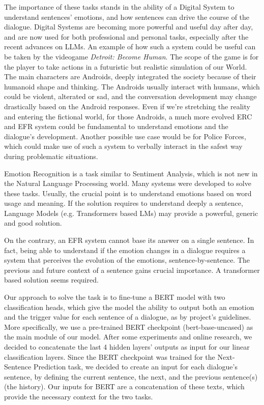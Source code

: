 \documentclass[11pt,table,xcdraw]{article}
\begin{document}
The importance of these tasks stands in the ability of a Digital System to understand sentences' emotions, and how sentences can drive the course of the dialogue. Digital Systems are becoming more powerful and useful day after day, and are now used for both professional and personal tasks, especially after the recent advances on LLMs. An example of how such a system could be useful can be taken by the videogame \textit{Detroit: Become Human}. The scope of the game is for the player to take actions in a futuristic but realistic simulation of our World. The main characters are Androids, deeply integrated the society because of their humanoid shape and thinking. The Androids usually interact with humans, which could be violent, alterated or sad, and the conversation development may change drastically based on the Android responses. Even if we're stretching the reality and entering the fictional world, for those Androids, a much more evolved ERC and EFR system could be fundamental to understand emotions and the dialogue's development. Another possible use case would be for Police Forces, which could make use of such a system to verbally interact in the safest way during problematic situations. 

Emotion Recognition is a task similar to Sentiment Analysis, which is not new in the Natural Language Processing world. Many systems were developed to solve these tasks. Usually, the crucial point is to understand emotions based on word usage and meaning. If the solution requires to understand deeply a sentence, Language Models (e.g. Transformers based LMs) may provide a powerful, generic and good solution.

On the contrary, an EFR system cannot base its answer on a single sentence. In fact, being able to understand if the emotion changes in a dialogue requires a system that perceives the evolution of the emotions, sentence-by-sentence. The previous and future context of a sentence gains crucial importance. A transformer based solution seems required.

Our approach to solve the task is to fine-tune a BERT model \cite{devlin2019bert} with two classification heads, which give the model the ability to output both an emotion and the trigger value for each sentence of a dialogue, as by project's guidelines. More specifically, we use a pre-trained BERT checkpoint (bert-base-uncased) as the main module of our model. After some experiments and online research, we decided to concatenate the last 4 hidden layers' outputs as input for our linear classification layers. Since the BERT checkpoint was trained for the Next-Sentence Prediction task, we decided to create an input for each dialogue's sentence, by defining the current sentence, the next, and the previous sentence(s) (the history). Our inputs for BERT are a concatenation of these texts, which provide the necessary context for the two tasks.
\end{document}
